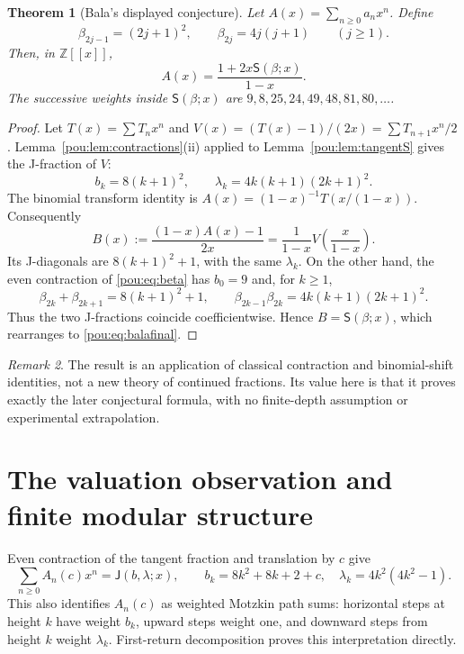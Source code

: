 \documentclass[11pt]{article}
\newtheorem{theorem}{Theorem}[section]
\theoremstyle{definition}
\theoremstyle{remark}
\newtheorem{remark}[theorem]{Remark}
\newcommand{\Z}{\mathbb Z}
\newcommand{\Sfrac}{\mathsf S}
\newcommand{\Jfrac}{\mathsf J}
\begin{document}
\begin{theorem}[Bala's displayed conjecture]\label{pou:thm:bala}
Let $A(x)=\sum_{n\ge0}a_nx^n$.  Define
\begin{equation}\label{pou:eq:beta}
 \beta_{2j-1}=(2j+1)^2,\qquad
 \beta_{2j}=4j(j+1)\qquad(j\ge1).
\end{equation}
Then, in $\Z[[x]]$,
\begin{equation}\label{pou:eq:balafinal}
 A(x)=\frac{1+2x\Sfrac(\beta;x)}{1-x}.
\end{equation}
The successive weights inside $\Sfrac(\beta;x)$ are
$9,8,25,24,49,48,81,80,\ldots$.
\end{theorem}
\begin{proof}
Let $T(x)=\sum T_nx^n$ and
$V(x)=(T(x)-1)/(2x)=\sum T_{n+1}x^n/2$.
Lemma~\ref{pou:lem:contractions}(ii) applied to Lemma~\ref{pou:lem:tangentS}
gives the J-fraction of $V$:
\begin{equation}\label{pou:eq:VJ}
 b_k=8(k+1)^2,\qquad
 \lambda_k=4k(k+1)(2k+1)^2.
\end{equation}
The binomial transform identity is
$A(x)=(1-x)^{-1}T(x/(1-x))$.  Consequently
\[
 B(x):=\frac{(1-x)A(x)-1}{2x}
      =\frac1{1-x}V\left(\frac{x}{1-x}\right).
\]
Its J-diagonals are $8(k+1)^2+1$, with the same $\lambda_k$.
On the other hand, the even contraction of \eqref{pou:eq:beta} has
$b_0=9$ and, for $k\ge1$,
\[
 \beta_{2k}+\beta_{2k+1}=8(k+1)^2+1,\qquad
 \beta_{2k-1}\beta_{2k}=4k(k+1)(2k+1)^2.
\]
Thus the two J-fractions coincide coefficientwise.  Hence
$B=\Sfrac(\beta;x)$, which rearranges to \eqref{pou:eq:balafinal}.
\end{proof}

\begin{remark}
The result is an application of classical contraction and binomial-shift
identities, not a new theory of continued fractions.  Its value here is that
it proves exactly the later conjectural formula, with no finite-depth
assumption or experimental extrapolation.
\end{remark}

\section{The valuation observation and finite modular structure}\label{pou:sec:modular}

Even contraction of the tangent fraction and translation by $c$ give
\begin{equation}\label{pou:eq:AJ}
 \sum_{n\ge0}A_n(c)x^n=\Jfrac(b,\lambda;x),\qquad
 b_k=8k^2+8k+2+c,\quad \lambda_k=4k^2(4k^2-1).
\end{equation}
This also identifies $A_n(c)$ as weighted Motzkin path sums: horizontal
steps at height $k$ have weight $b_k$, upward steps weight one, and downward
steps from height $k$ weight $\lambda_k$.  First-return decomposition proves
this interpretation directly.
\end{document}
